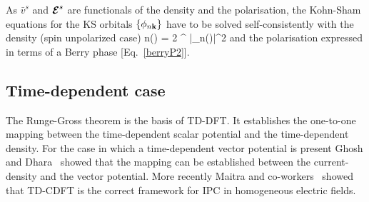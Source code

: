 As $\bar v^{s}$ and $\boldsymbol{\cal E}^{s}$ are functionals of the density and the polarisation, the Kohn-Sham equations
for the KS orbitals $\{\phi_{n{\bf k}}\}$  have to be solved self-consistently with the density (spin unpolarized case)
\be
n(\rr) = 2 \sum^{} |\phi_{n\kk}(\rr)|^2 
\ee
and the polarisation expressed in terms of a Berry phase [Eq.~\eqref{berryP2}].


\subsection{Time-dependent case}
The Runge-Gross theorem \cite{PhysRevLett.52.997} is the basis of TD-DFT. It establishes the one-to-one mapping between the time-dependent scalar potential and the time-dependent density. For the case in which a time-dependent vector potential is present Ghosh and Dhara~\cite{PhysRevA.38.1149} showed that the mapping can be established between the current-density and the vector potential. More recently Maitra and co-workers~\cite{maitra2003current} showed that TD-CDFT is the correct framework for IPC in homogeneous electric fields.

